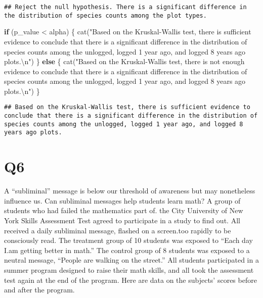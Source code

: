 \documentclass[
]{article}
\newenvironment{Shaded}{\begin{snugshade}}{\end{snugshade}}
\newcommand{\ControlFlowTok}[1]{\textcolor[rgb]{0.13,0.29,0.53}{\textbf{#1}}}
\newcommand{\FunctionTok}[1]{\textcolor[rgb]{0.00,0.00,0.00}{#1}}
\newcommand{\NormalTok}[1]{#1}
\newcommand{\SpecialCharTok}[1]{\textcolor[rgb]{0.00,0.00,0.00}{#1}}
\newcommand{\StringTok}[1]{\textcolor[rgb]{0.31,0.60,0.02}{#1}}
\begin{document}
\begin{verbatim}
## Reject the null hypothesis. There is a significant difference in the distribution of species counts among the plot types.
\end{verbatim}

\begin{Shaded}
\begin{Highlighting}[]
\ControlFlowTok{if}\NormalTok{ (p\_value }\SpecialCharTok{\textless{}}\NormalTok{ alpha) \{}
  \FunctionTok{cat}\NormalTok{(}\StringTok{"Based on the Kruskal{-}Wallis test, there is sufficient evidence to conclude that there is a significant difference in the distribution of species counts among the unlogged, logged 1 year ago, and logged 8 years ago plots.}\SpecialCharTok{\textbackslash{}n}\StringTok{"}\NormalTok{)}
\NormalTok{\} }\ControlFlowTok{else}\NormalTok{ \{}
  \FunctionTok{cat}\NormalTok{(}\StringTok{"Based on the Kruskal{-}Wallis test, there is not enough evidence to conclude that there is a significant difference in the distribution of species counts among the unlogged, logged 1 year ago, and logged 8 years ago plots.}\SpecialCharTok{\textbackslash{}n}\StringTok{"}\NormalTok{)}
\NormalTok{\}}
\end{Highlighting}
\end{Shaded}

\begin{verbatim}
## Based on the Kruskal-Wallis test, there is sufficient evidence to conclude that there is a significant difference in the distribution of species counts among the unlogged, logged 1 year ago, and logged 8 years ago plots.
\end{verbatim}

\hypertarget{q6}{%
\section{Q6}\label{q6}}

A ``subliminal'' message is below our threshold of awareness but may
nonetheless influence us. Can subliminal messages help students learn
math? A group of students who had failed the mathematics part of. the
City University of New York Skills Assessment Test agreed to participate
in a study to find out. All received a daily subliminal message, flashed
on a screen.too rapidly to be consciously read. The treatment group of
10 students was exposed to ``Each day I.am getting better in math.'' The
control group of 8 students was exposed to a neutral message, ``People
are walking on the street.'' All students participated in a summer
program designed to raise their math skills, and all took the assessment
test again at the end of the program. Here are data on the subjects'
scores before and after the program.
\end{document}
